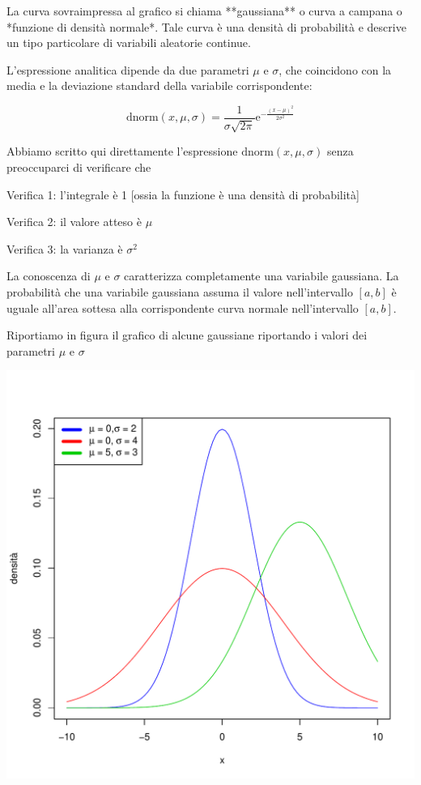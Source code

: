\documentclass[onecolumn,12pt]{book}\usepackage[]{graphicx}\usepackage[]{color}
\makeatletter
\def\maxwidth{ %
  \ifdim\Gin@nat@width>\linewidth
    \linewidth
  \else
    \Gin@nat@width
  \fi
}
\newenvironment{knitrout}{}{} %
\makeatother
\begin{document}
La curva sovraimpressa al grafico si chiama **gaussiana** o curva a campana o *funzione di densità normale*. Tale curva è una densità di probabilità e descrive un tipo particolare di variabili aleatorie continue.

L'espressione analitica  dipende da due parametri $\mu$ e $\sigma$,  che coincidono con la media e la deviazione standard della variabile corrispondente:


$$\textrm{dnorm}(x,\mu,\sigma)=\frac{1}{\sigma\sqrt{2 \pi} } \textrm{e}^{-\frac{(x - \mu)^2}{2 \sigma^2}}$$

Abbiamo scritto qui direttamente l'espressione $\textrm{dnorm}(x,\mu,\sigma)$ senza preoccuparci di verificare che

Verifica 1:  l'integrale è 1 [ossia la funzione è una densità di probabilità]

Verifica 2: il valore atteso è $\mu$
 
Verifica 3: la varianza è $\sigma^2$

La conoscenza di $\mu$ e $\sigma$ caratterizza completamente una variabile gaussiana.  La probabilità che una variabile gaussiana assuma il valore nell'intervallo $[a,b]$ è uguale all'area sottesa alla corrispondente curva normale nell'intervallo $[a,b]$.


Riportiamo in figura  il grafico di alcune gaussiane riportando i valori dei parametri  $\mu$ e $\sigma$

\begin{knitrout}
\color{fgcolor}
\includegraphics[width=\maxwidth]{figure/unnamed-chunk-136-1} 

\end{knitrout}
\end{document}

